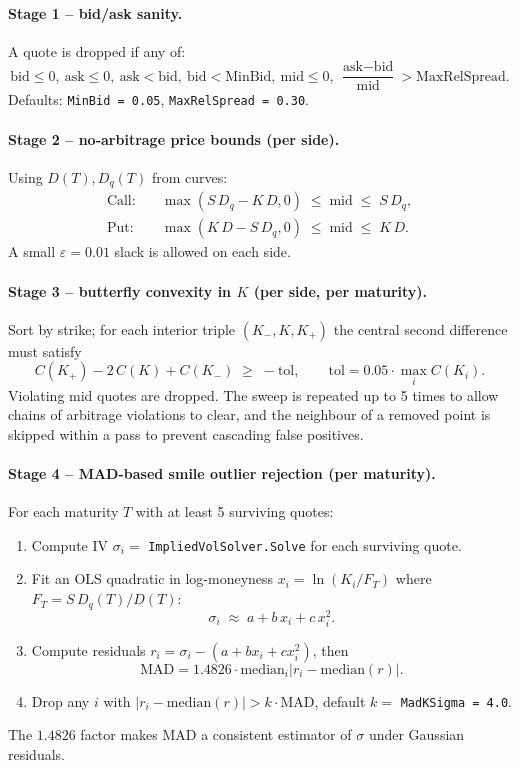 \documentclass[11pt,a4paper]{article}
\begin{document}
\paragraph{Stage 1 -- bid/ask sanity.} A quote is dropped if any of:
\[
\text{bid}\le 0,\ \text{ask}\le 0,\ \text{ask}<\text{bid},\ \text{bid} < \text{MinBid},\ \text{mid}\le 0,\ \frac{\text{ask} - \text{bid}}{\text{mid}} > \text{MaxRelSpread}.
\]
Defaults: \texttt{MinBid = 0.05}, \texttt{MaxRelSpread = 0.30}.

\paragraph{Stage 2 -- no-arbitrage price bounds (per side).} Using $D(T), D_q(T)$ from
curves:
\begin{align*}
\text{Call:} &\quad \max(S\, D_q - K\, D, 0)\;\le\;\text{mid}\;\le\;S\, D_q,\\
\text{Put:}  &\quad \max(K\, D - S\, D_q, 0)\;\le\;\text{mid}\;\le\;K\, D.
\end{align*}
A small $\varepsilon = 0.01$ slack is allowed on each side.

\paragraph{Stage 3 -- butterfly convexity in $K$ (per side, per maturity).}
Sort by strike; for each interior triple $(K_-, K, K_+)$ the central second
difference must satisfy
\[
C(K_+) - 2\,C(K) + C(K_-) \;\ge\; -\text{tol},
\qquad \text{tol} = 0.05 \cdot \max_i C(K_i).
\]
Violating mid quotes are dropped. The sweep is repeated up to 5 times to allow
chains of arbitrage violations to clear, and the neighbour of a removed point
is skipped within a pass to prevent cascading false positives.

\paragraph{Stage 4 -- MAD-based smile outlier rejection (per maturity).}
For each maturity $T$ with at least 5 surviving quotes:
\begin{enumerate}
\item Compute IV $\sigma_i = $ \texttt{ImpliedVolSolver.Solve} for each surviving quote.
\item Fit an OLS quadratic in log-moneyness
$x_i = \ln(K_i / F_T)$ where $F_T = S\, D_q(T)/D(T)$:
\[
\sigma_i \;\approx\; a + b\, x_i + c\, x_i^2.
\]
\item Compute residuals $r_i = \sigma_i - (a + b x_i + c x_i^2)$, then
\[
\mathrm{MAD} = 1.4826 \cdot \mathrm{median}_i \big|r_i - \mathrm{median}(r)\big|.
\]
\item Drop any $i$ with $|r_i - \mathrm{median}(r)| > k\cdot\mathrm{MAD}$,
default $k = $ \texttt{MadKSigma = 4.0}.
\end{enumerate}
The $1.4826$ factor makes MAD a consistent estimator of $\sigma$ under
Gaussian residuals.
\end{document}
